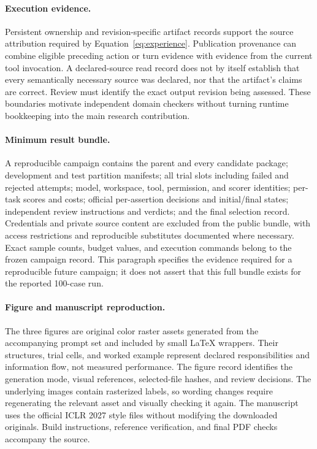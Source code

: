 \paragraph{Execution evidence.}
Persistent ownership and revision-specific artifact records support the source attribution required by Equation~\ref{eq:experience}. Publication provenance can combine eligible preceding action or turn evidence with evidence from the current tool invocation. A declared-source read record does not by itself establish that every semantically necessary source was declared, nor that the artifact's claims are correct. Review must identify the exact output revision being assessed. These boundaries motivate independent domain checkers without turning runtime bookkeeping into the main research contribution.

\paragraph{Minimum result bundle.}
A reproducible campaign contains the parent and every candidate package; development and test partition manifests; all trial slots including failed and rejected attempts; model, workspace, tool, permission, and scorer identities; per-task scores and costs; official per-assertion decisions and initial/final states; independent review instructions and verdicts; and the final selection record. Credentials and private source content are excluded from the public bundle, with access restrictions and reproducible substitutes documented where necessary. Exact sample counts, budget values, and execution commands belong to the frozen campaign record. This paragraph specifies the evidence required for a reproducible future campaign; it does not assert that this full bundle exists for the reported 100-case run.

\paragraph{Figure and manuscript reproduction.}
The three figures are original color raster assets generated from the accompanying prompt set and included by small LaTeX wrappers. Their structures, trial cells, and worked example represent declared responsibilities and information flow, not measured performance. The figure record identifies the generation mode, visual references, selected-file hashes, and review decisions. The underlying images contain rasterized labels, so wording changes require regenerating the relevant asset and visually checking it again. The manuscript uses the official ICLR 2027 style files without modifying the downloaded originals. Build instructions, reference verification, and final PDF checks accompany the source.
